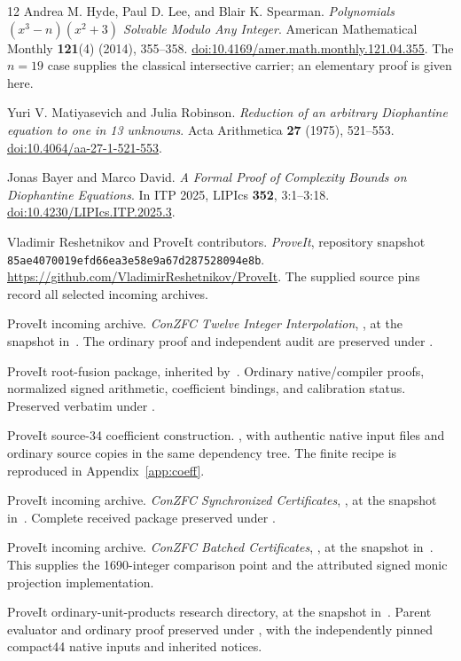 \begin{thebibliography}{12}
Andrea M. Hyde, Paul D. Lee, and Blair K. Spearman.
\emph{Polynomials $(x^3-n)(x^2+3)$ Solvable Modulo Any Integer}.
American Mathematical Monthly \textbf{121}(4) (2014), 355--358.
\href{https://doi.org/10.4169/amer.math.monthly.121.04.355}
{doi:10.4169/amer.math.monthly.121.04.355}.
The $n=19$ case supplies the classical intersective carrier;
an elementary proof is given here.

Yuri V. Matiyasevich and Julia Robinson.
\emph{Reduction of an arbitrary Diophantine equation to one in 13 unknowns}.
Acta Arithmetica \textbf{27} (1975), 521--553.
\href{https://doi.org/10.4064/aa-27-1-521-553}
{doi:10.4064/aa-27-1-521-553}.

Jonas Bayer and Marco David.
\emph{A Formal Proof of Complexity Bounds on Diophantine Equations}.
In ITP 2025, LIPIcs \textbf{352}, 3:1--3:18.
\href{https://doi.org/10.4230/LIPIcs.ITP.2025.3}
{doi:10.4230/LIPIcs.ITP.2025.3}.

Vladimir Reshetnikov and ProveIt contributors.
\emph{ProveIt}, repository snapshot
\texttt{85ae4070019efd66ea3e58e9a67d287528094e8b}.
\url{https://github.com/VladimirReshetnikov/ProveIt}.
The supplied source pins record all selected incoming archives.

ProveIt incoming archive.
\emph{ConZFC Twelve Integer Interpolation},
,
at the snapshot in~\cite{repo}.
The ordinary proof  and independent
audit are preserved under .

ProveIt root-fusion package, inherited by~\cite{interpolation}.
Ordinary native/compiler proofs, normalized signed arithmetic,
coefficient bindings, and calibration status.
Preserved verbatim under .

ProveIt source-34 coefficient construction.
,
with authentic native input files and ordinary source copies in the
same dependency tree. The finite recipe is reproduced in
Appendix~\ref{app:coeff}.

ProveIt incoming archive.
\emph{ConZFC Synchronized Certificates},
,
at the snapshot in~\cite{repo}. Complete received package preserved
under .

ProveIt incoming archive.
\emph{ConZFC Batched Certificates},
,
at the snapshot in~\cite{repo}. This supplies the 1690-integer comparison
point and the attributed signed monic projection implementation.

ProveIt ordinary-unit-products research directory, at the snapshot
in~\cite{repo}. Parent evaluator and ordinary proof preserved under
, with the independently pinned compact44
native inputs and inherited notices.
\end{thebibliography}

